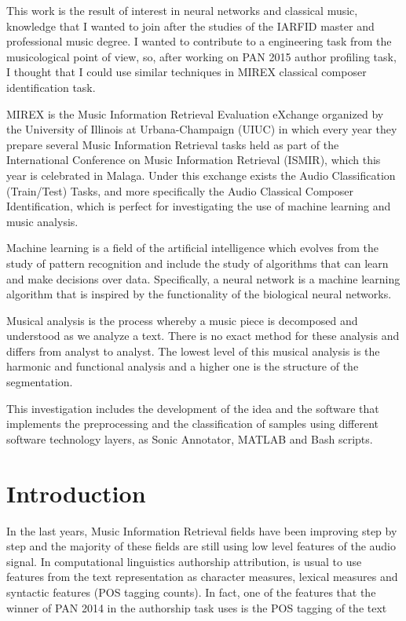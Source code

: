 \documentclass[a4paper,openany,oneside,12pt]{book}
\begin{document}
This work is the result of interest in neural networks and classical music, knowledge that I wanted to join after the studies of the IARFID master and professional music degree. I wanted to contribute to a engineering task from the musicological point of view, so, after working on PAN 2015 author profiling task, I thought that I could use similar techniques in MIREX classical composer identification task.

MIREX is the Music Information Retrieval Evaluation eXchange organized by the University of Illinois at Urbana-Champaign (UIUC) in which every year they prepare several Music Information Retrieval tasks held as part of the International Conference on Music Information Retrieval (ISMIR), which this year is celebrated in Malaga. Under this exchange exists the Audio Classification (Train/Test) Tasks, and more specifically the Audio Classical Composer Identification, which is perfect for investigating the use of machine learning and music analysis.

Machine learning is a field of the artificial intelligence which evolves from the study of pattern recognition and include the study of algorithms that can learn and make decisions over data. Specifically, a neural network is a machine learning algorithm that is inspired by the functionality of the biological neural networks.

Musical analysis is the process whereby a music piece is decomposed and understood as we analyze a text. There is no exact method for these analysis and differs from analyst to analyst. The lowest level of this musical analysis is the harmonic and functional analysis and a higher one is the structure of the segmentation.

This investigation includes the development of the idea and the software that implements the preprocessing and the classification of samples using different software technology layers, as Sonic Annotator, MATLAB and Bash scripts.


\newpage


\tableofcontents %

\cleardoublepage
{} %
\listoffigures %





\chapter{Introduction} %
In the last years, Music Information Retrieval fields have been improving step by step and the majority of these fields are still using low level features of the audio signal. In computational linguistics authorship attribution, is usual to use features from the text representation as character measures, lexical measures and syntactic features (POS tagging counts). In fact, one of the features that the winner of PAN 2014 in the authorship task uses is the POS tagging of the text \cite{pan14}
\end{document}
